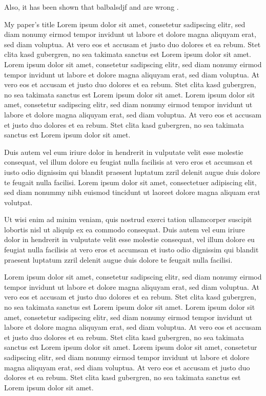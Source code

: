 \documentclass[11pt]{article}
\begin{document}
Also, it has been shown that balbalsdjf and  are wrong \cite{chua1993cnn}.

\newpage

My paper's title
Lorem ipsum dolor sit amet, consetetur sadipscing elitr, sed diam nonumy eirmod tempor invidunt ut labore et dolore magna aliquyam erat, sed diam voluptua. At vero eos et accusam et justo duo dolores et ea rebum. Stet clita kasd gubergren, no sea takimata sanctus est Lorem ipsum dolor sit amet. Lorem ipsum dolor sit amet, consetetur sadipscing elitr, sed diam nonumy eirmod tempor invidunt ut labore et dolore magna aliquyam erat, sed diam voluptua. At vero eos et accusam et justo duo dolores et ea rebum. Stet clita kasd gubergren, no sea takimata sanctus est Lorem ipsum dolor sit amet. Lorem ipsum dolor sit amet, consetetur sadipscing elitr, sed diam nonumy eirmod tempor invidunt ut labore et dolore magna aliquyam erat, sed diam voluptua. At vero eos et accusam et justo duo dolores et ea rebum. Stet clita kasd gubergren, no sea takimata sanctus est Lorem ipsum dolor sit amet.   

Duis autem vel eum iriure dolor in hendrerit in vulputate velit esse molestie consequat, vel illum dolore eu feugiat nulla facilisis at vero eros et accumsan et iusto odio dignissim qui blandit praesent luptatum zzril delenit augue duis dolore te feugait nulla facilisi. Lorem ipsum dolor sit amet, consectetuer adipiscing elit, sed diam nonummy nibh euismod tincidunt ut laoreet dolore magna aliquam erat volutpat.   

Ut wisi enim ad minim veniam, quis nostrud exerci tation ullamcorper suscipit lobortis nisl ut aliquip ex ea commodo consequat. Duis autem vel eum iriure dolor in hendrerit in vulputate velit esse molestie consequat, vel illum dolore eu feugiat nulla facilisis at vero eros et accumsan et iusto odio dignissim qui blandit praesent luptatum zzril delenit augue duis dolore te feugait nulla facilisi. 

Lorem ipsum dolor sit amet, consetetur sadipscing elitr, sed diam nonumy eirmod tempor invidunt ut labore et dolore magna aliquyam erat, sed diam voluptua. At vero eos et accusam et justo duo dolores et ea rebum. Stet clita kasd gubergren, no sea takimata sanctus est Lorem ipsum dolor sit amet. Lorem ipsum dolor sit amet, consetetur sadipscing elitr, sed diam nonumy eirmod tempor invidunt ut labore et dolore magna aliquyam erat, sed diam voluptua. At vero eos et accusam et justo duo dolores et ea rebum. Stet clita kasd gubergren, no sea takimata sanctus est Lorem ipsum dolor sit amet. Lorem ipsum dolor sit amet, consetetur sadipscing elitr, sed diam nonumy eirmod tempor invidunt ut labore et dolore magna aliquyam erat, sed diam voluptua. At vero eos et accusam et justo duo dolores et ea rebum. Stet clita kasd gubergren, no sea takimata sanctus est Lorem ipsum dolor sit amet.   
\end{document}
